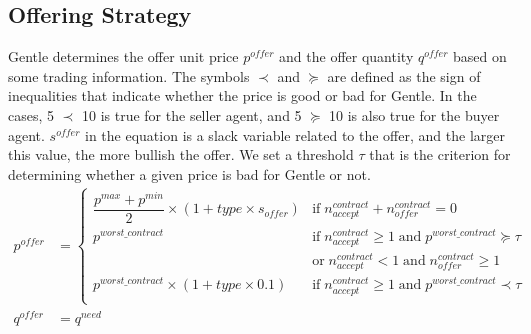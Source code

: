 \documentclass[uplatex, 10pt, a4j]{jsarticle}
\begin{document}
\subsection{\textrm{Offering Strategy}}
Gentle determines the offer unit price $p^{offer}$ and the offer quantity $q^{offer}$ based on some trading information.
The symbols $\prec$ and $\succeq$ are defined as the sign of inequalities that indicate whether the price is good or bad for Gentle.
In the cases, 5 $\prec$ 10 is true for the seller agent, and 5 $\succeq$ 10 is also true for the buyer agent.
$s^{offer}$ in the equation is a slack variable related to the offer, and the larger this value, the more bullish the offer.
We set a threshold $\tau$ that is the criterion for determining whether a given price is bad for Gentle or not.
\begin{equation*}
    \begin{split}
        p^{offer}&=\left\{\begin{array}{ll}
            \dfrac{p^{max}+p^{min}}{2} \times \left(1+type\times s_{offer}\right) & \mathrm{if} \; n^{contract}_{accept}+n^{contract}_{offer}=0                                      \\ [3mm]
            p^{worst\_contract}                                                              & \mathrm{if} \; n^{contract}_{accept} \geq 1 \; \mathrm{and} \; p^{worst\_contract} \succeq  \tau \\ [1mm]
                                                                                             & \mathrm{or} \; n^{contract}_{accept}<1 \; \mathrm{and} \; n^{contract}_{offer} \geq 1            \\ [3mm]
            p^{worst\_contract} \times \left(1 + type \times 0.1\right)           & \mathrm{if} \; n^{contract}_{accept} \geq 1 \; \mathrm{and} \; p^{worst\_contract} \prec \tau    \\
        \end{array}\right. \\
        q^{offer} &= q^{need} \\
    \end{split}
\end{equation*}
\end{document}
